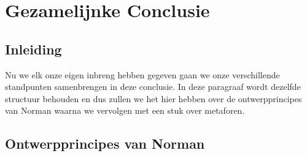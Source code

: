 \documentclass[11pt]{article}
\begin{document}
\section{Gezamelijnke Conclusie}
\subsection{Inleiding}
Nu we elk onze eigen inbreng hebben gegeven gaan we onze verschillende standpunten samenbrengen in deze conclusie. In deze paragraaf wordt dezelfde structuur behouden en dus zullen we het hier hebben over de ontwerpprincipes van Norman waarna we vervolgen met een stuk over metaforen.

\subsection{Ontwerpprincipes van Norman}
\end{document}
